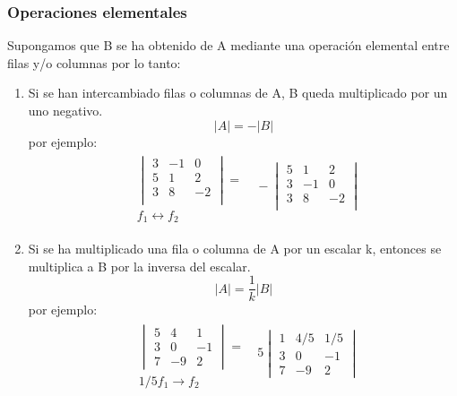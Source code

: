 \subsubsection*{Operaciones elementales}
Supongamos que B se ha obtenido de A mediante una operación elemental entre filas y/o columnas por lo tanto:
\begin{enumerate}
	\item Si se han intercambiado filas o columnas de A, B queda multiplicado por un uno negativo.
	$$ |A|=-|B| $$
	por ejemplo:
	\begin{align*}
		&\begin{matrix}
			\begin{vmatrix}
				3&-1&0\\
				5&1&2\\
				3&8&-2\\
			\end{vmatrix}=\\
			f_1\leftrightarrow f_2
		\end{matrix} \begin{matrix}
			\ -\begin{vmatrix}
				5&1&2\\
				3&-1&0\\
				3&8&-2\\
			\end{vmatrix}\\
			\
		\end{matrix}
	\end{align*}
	\item Si se ha multiplicado una fila o columna de A por un escalar k, entonces se multiplica a B por la inversa del escalar.
	$$ |A|=\frac{1}{k}|B| $$
	por ejemplo:
	\begin{align*}
		&\begin{matrix}
			\begin{vmatrix}
				5&4&1\\
				3&0&-1\\
				7&-9&2
			\end{vmatrix}= \ \\
			1/5 f_1\rightarrow f_2
		\end{matrix}\begin{matrix}
		5\begin{vmatrix}
			1&4/5&1/5\\
			3&0&-1\\
			7&-9&2
		\end{vmatrix}\\
		\
		\end{matrix}

\end{align*}
\end{enumerate}
